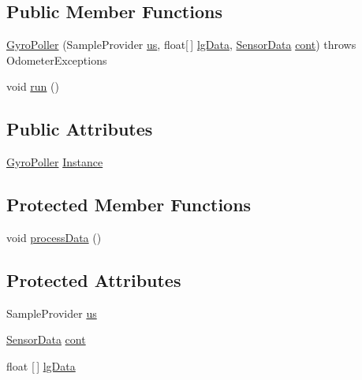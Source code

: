 \subsection*{Public Member Functions}
\begin{DoxyCompactItemize}
\item 
\hyperlink{classca_1_1mcgill_1_1ecse211_1_1threads_1_1_gyro_poller_a1bab49cc19ee3b633ddbec4c408927bf}{Gyro\+Poller} (Sample\+Provider \hyperlink{classca_1_1mcgill_1_1ecse211_1_1threads_1_1_gyro_poller_af478329ec7a335a4f3d2d412d5d10091}{us}, float\mbox{[}$\,$\mbox{]} \hyperlink{classca_1_1mcgill_1_1ecse211_1_1threads_1_1_gyro_poller_a112e433b3561e89927357051f55f8cf1}{lg\+Data}, \hyperlink{classca_1_1mcgill_1_1ecse211_1_1threads_1_1_sensor_data}{Sensor\+Data} \hyperlink{classca_1_1mcgill_1_1ecse211_1_1threads_1_1_gyro_poller_a90507a3d6038ff7ec7881640b5dd4263}{cont})  throws Odometer\+Exceptions 
\item 
void \hyperlink{classca_1_1mcgill_1_1ecse211_1_1threads_1_1_gyro_poller_a7a3232e355cece714fa85a3a902d9cfd}{run} ()
\end{DoxyCompactItemize}
\subsection*{Public Attributes}
\begin{DoxyCompactItemize}
\item 
\hyperlink{classca_1_1mcgill_1_1ecse211_1_1threads_1_1_gyro_poller}{Gyro\+Poller} \hyperlink{classca_1_1mcgill_1_1ecse211_1_1threads_1_1_gyro_poller_a181979440aafff52b0ba5aaff9064f80}{Instance}
\end{DoxyCompactItemize}
\subsection*{Protected Member Functions}
\begin{DoxyCompactItemize}
\item 
void \hyperlink{classca_1_1mcgill_1_1ecse211_1_1threads_1_1_gyro_poller_a27f914ed77f23805210998fc0ee2daa7}{process\+Data} ()
\end{DoxyCompactItemize}
\subsection*{Protected Attributes}
\begin{DoxyCompactItemize}
\item 
Sample\+Provider \hyperlink{classca_1_1mcgill_1_1ecse211_1_1threads_1_1_gyro_poller_af478329ec7a335a4f3d2d412d5d10091}{us}
\item 
\hyperlink{classca_1_1mcgill_1_1ecse211_1_1threads_1_1_sensor_data}{Sensor\+Data} \hyperlink{classca_1_1mcgill_1_1ecse211_1_1threads_1_1_gyro_poller_a90507a3d6038ff7ec7881640b5dd4263}{cont}
\item 
float \mbox{[}$\,$\mbox{]} \hyperlink{classca_1_1mcgill_1_1ecse211_1_1threads_1_1_gyro_poller_a112e433b3561e89927357051f55f8cf1}{lg\+Data}
\end{DoxyCompactItemize}


